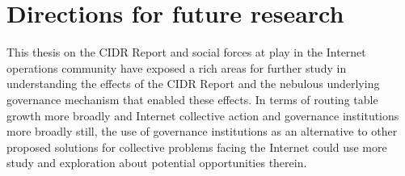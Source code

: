 %
%
%
%
%
%
%

\section{Directions for future research}
This thesis on the CIDR Report and social forces at play in the Internet
operations community have exposed a rich areas for further study in
understanding the effects of the CIDR Report and the nebulous underlying
governance mechanism that enabled these effects. In terms of routing table
growth more broadly and Internet collective action and governance institutions
more broadly still, the use of governance institutions as an alternative to
other proposed solutions for collective problems facing the Internet could use
more study and exploration about potential opportunities therein.


